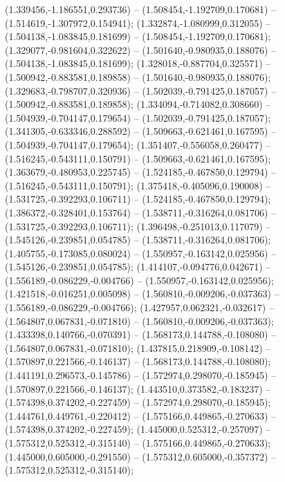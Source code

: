  (1.339456,-1.186551,0.293736) -- (1.508454,-1.192709,0.170681) -- (1.514619,-1.307972,0.154941);
 (1.332874,-1.080999,0.312055) -- (1.504138,-1.083845,0.181699) -- (1.508454,-1.192709,0.170681);
 (1.329077,-0.981604,0.322622) -- (1.501640,-0.980935,0.188076) -- (1.504138,-1.083845,0.181699);
 (1.328018,-0.887704,0.325571) -- (1.500942,-0.883581,0.189858) -- (1.501640,-0.980935,0.188076);
 (1.329683,-0.798707,0.320936) -- (1.502039,-0.791425,0.187057) -- (1.500942,-0.883581,0.189858);
 (1.334094,-0.714082,0.308660) -- (1.504939,-0.704147,0.179654) -- (1.502039,-0.791425,0.187057);
 (1.341305,-0.633346,0.288592) -- (1.509663,-0.621461,0.167595) -- (1.504939,-0.704147,0.179654);
 (1.351407,-0.556058,0.260477) -- (1.516245,-0.543111,0.150791) -- (1.509663,-0.621461,0.167595);
 (1.363679,-0.480953,0.225745) -- (1.524185,-0.467850,0.129794) -- (1.516245,-0.543111,0.150791);
 (1.375418,-0.405096,0.190008) -- (1.531725,-0.392293,0.106711) -- (1.524185,-0.467850,0.129794);
 (1.386372,-0.328401,0.153764) -- (1.538711,-0.316264,0.081706) -- (1.531725,-0.392293,0.106711);
 (1.396498,-0.251013,0.117079) -- (1.545126,-0.239851,0.054785) -- (1.538711,-0.316264,0.081706);
 (1.405755,-0.173085,0.080024) -- (1.550957,-0.163142,0.025956) -- (1.545126,-0.239851,0.054785);
 (1.414107,-0.094776,0.042671) -- (1.556189,-0.086229,-0.004766) -- (1.550957,-0.163142,0.025956);
 (1.421518,-0.016251,0.005098) -- (1.560810,-0.009206,-0.037363) -- (1.556189,-0.086229,-0.004766);
 (1.427957,0.062321,-0.032617) -- (1.564807,0.067831,-0.071810) -- (1.560810,-0.009206,-0.037363);
 (1.433398,0.140766,-0.070391) -- (1.568173,0.144788,-0.108080) -- (1.564807,0.067831,-0.071810);
 (1.437815,0.218909,-0.108142) -- (1.570897,0.221566,-0.146137) -- (1.568173,0.144788,-0.108080);
 (1.441191,0.296573,-0.145786) -- (1.572974,0.298070,-0.185945) -- (1.570897,0.221566,-0.146137);
 (1.443510,0.373582,-0.183237) -- (1.574398,0.374202,-0.227459) -- (1.572974,0.298070,-0.185945);
 (1.444761,0.449761,-0.220412) -- (1.575166,0.449865,-0.270633) -- (1.574398,0.374202,-0.227459);
 (1.445000,0.525312,-0.257097) -- (1.575312,0.525312,-0.315140) -- (1.575166,0.449865,-0.270633);
 (1.445000,0.605000,-0.291550) -- (1.575312,0.605000,-0.357372) -- (1.575312,0.525312,-0.315140);
